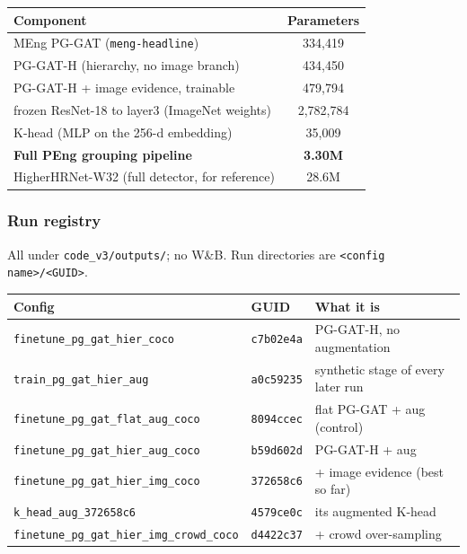 \begin{tabular}{lc}
\hline
\textbf{Component} & \textbf{Parameters} \\
\hline
MEng PG-GAT (\texttt{meng-headline})                 & 334,419 \\
PG-GAT-H (hierarchy, no image branch)               & 434,450 \\
PG-GAT-H + image evidence, trainable                & 479,794 \\
frozen ResNet-18 to layer3 (ImageNet weights)        & 2,782,784 \\
K-head (MLP on the 256-d embedding)                  & 35,009 \\
\textbf{Full PEng grouping pipeline}                 & \textbf{3.30M} \\
HigherHRNet-W32 (full detector, for reference)      & 28.6M \\
\hline
\end{tabular}

\subsubsection{Run registry}

All under \texttt{code\_v3/outputs/}; no W\&B. Run directories are \texttt{<config name>/<GUID>}.

\vspace{0.5em}

{\small
\begin{tabular}{lll}
\hline
\textbf{Config} & \textbf{GUID} & \textbf{What it is} \\
\hline
\texttt{finetune\_pg\_gat\_hier\_coco}        & \texttt{c7b02e4a} & PG-GAT-H, no augmentation \\
\texttt{train\_pg\_gat\_hier\_aug}            & \texttt{a0c59235} & synthetic stage of every later run \\
\texttt{finetune\_pg\_gat\_flat\_aug\_coco}   & \texttt{8094ccec} & flat PG-GAT + aug (control) \\
\texttt{finetune\_pg\_gat\_hier\_aug\_coco}   & \texttt{b59d602d} & PG-GAT-H + aug \\
\texttt{finetune\_pg\_gat\_hier\_img\_coco}   & \texttt{372658c6} & + image evidence (best so far) \\
\texttt{k\_head\_aug\_372658c6}               & \texttt{4579ce0c} & its augmented K-head \\
\texttt{finetune\_pg\_gat\_hier\_img\_crowd\_coco} & \texttt{d4422c37} & + crowd over-sampling \\
\hline
\end{tabular}
}

